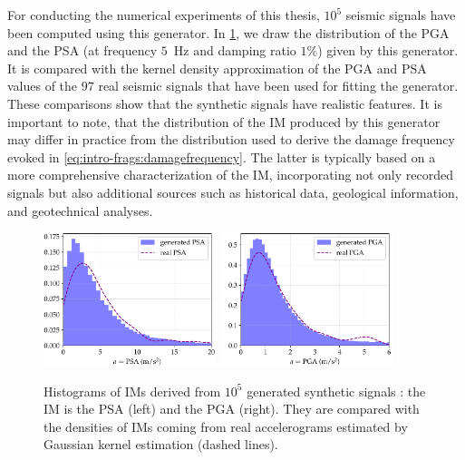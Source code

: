 For  conducting the numerical experiments of this thesis, $10^5$ seismic signals have been computed using this generator.
In \cref{fig:intro-frags:IM-density}, we draw the distribution of the PGA and the PSA (at frequency $5$~Hz and damping ratio $1\%$) given by this generator. It is compared with the kernel density approximation of the PGA and PSA values of the $97$ real seismic signals that have been used for fitting the generator. %
These comparisons show that the synthetic signals have realistic features.
It is important to note, that the distribution of the IM produced by this generator may differ in practice from the distribution used to derive the damage frequency evoked in \cref{eq:intro-frags:damagefrequency}. The latter is typically based on a more comprehensive characterization of the IM, incorporating not only recorded signals but also additional sources such as historical data, geological information, and geotechnical analyses.




\begin{figure}[h]
    \centering
    \includegraphics[width=5cm]{figures/intro-frags/PSA_density.pdf}\ 
    \includegraphics[width=5cm]{figures/intro-frags/PGA_density.pdf}
    \caption{Histograms of IMs derived from $10^5$ generated synthetic signals : the IM is the PSA (left) and the PGA (right). They are compared with the densities of IMs coming from real accelerograms estimated by Gaussian kernel estimation (dashed lines).} %
    \label{fig:intro-frags:IM-density}
\end{figure}



